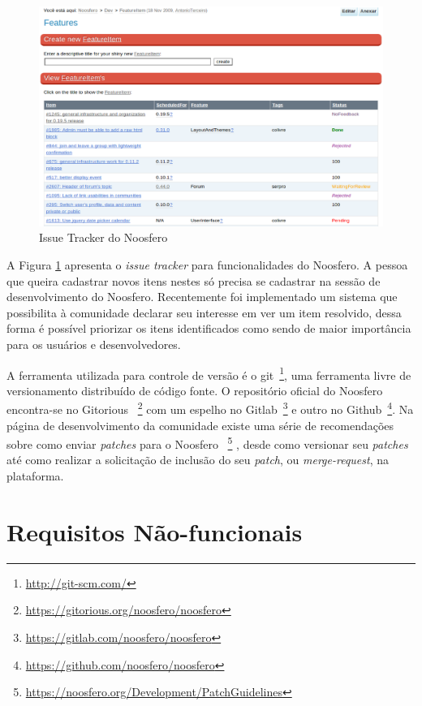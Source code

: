 \begin{figure}[h]
	\centering
	\includegraphics[keepaspectratio=true,scale=0.4]
	  {figuras/issue-tracker.eps}
	\caption{Issue Tracker do Noosfero}
	\label{issue-tracker}
\end{figure}

A Figura \ref{issue-tracker} apresenta o \textit{issue tracker} para
funcionalidades do Noosfero.
%
A pessoa que queira cadastrar novos itens nestes só precisa se cadastrar
na sessão de desenvolvimento do Noosfero.
%
Recentemente foi implementado um sistema que possibilita à comunidade declarar
seu interesse em ver um item resolvido, dessa forma é possível priorizar os
itens identificados como sendo de maior importância para os usuários e
desenvolvedores.

A ferramenta utilizada para controle de versão é o git~\footnote{
\url{http://git-scm.com/}}, uma ferramenta livre de versionamento distribuído
de código fonte. O repositório oficial do Noosfero encontra-se no Gitorious
~\footnote{\url{https://gitorious.org/noosfero/noosfero}} com um espelho no
Gitlab~\footnote{\url{https://gitlab.com/noosfero/noosfero}} e outro no
Github~\footnote{\url{https://github.com/noosfero/noosfero}}.
%
Na página de desenvolvimento da comunidade existe uma série de recomendações
sobre como enviar \textit{patches} para o Noosfero%
~\footnote{\url{https://noosfero.org/Development/PatchGuidelines}}
, desde como versionar seu \textit{patches} até como realizar a solicitação de
inclusão do seu \textit{patch}, ou \textit{merge-request}, na plataforma.


\section{Requisitos Não-funcionais}

